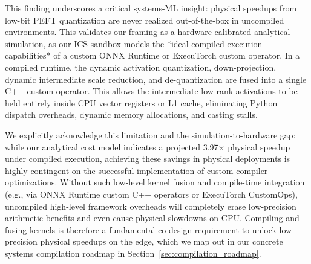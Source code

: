 This finding underscores a critical systems-ML insight: physical speedups from low-bit PEFT quantization are never realized out-of-the-box in uncompiled environments. This validates our framing as a hardware-calibrated analytical simulation, as our ICS sandbox models the *ideal compiled execution capabilities* of a custom ONNX Runtime or ExecuTorch custom operator. In a compiled runtime, the dynamic activation quantization, down-projection, dynamic intermediate scale reduction, and de-quantization are fused into a single C++ custom operator. This allows the intermediate low-rank activations to be held entirely inside CPU vector registers or L1 cache, eliminating Python dispatch overheads, dynamic memory allocations, and casting stalls. 

We explicitly acknowledge this limitation and the simulation-to-hardware gap: while our analytical cost model indicates a projected 3.97$\times$ physical speedup under compiled execution, achieving these savings in physical deployments is highly contingent on the successful implementation of custom compiler optimizations. Without such low-level kernel fusion and compile-time integration (e.g., via ONNX Runtime custom C++ operators or ExecuTorch CustomOps), uncompiled high-level framework overheads will completely erase low-precision arithmetic benefits and even cause physical slowdowns on CPU. Compiling and fusing kernels is therefore a fundamental co-design requirement to unlock low-precision physical speedups on the edge, which we map out in our concrete systems compilation roadmap in Section~\ref{sec:compilation_roadmap}.
